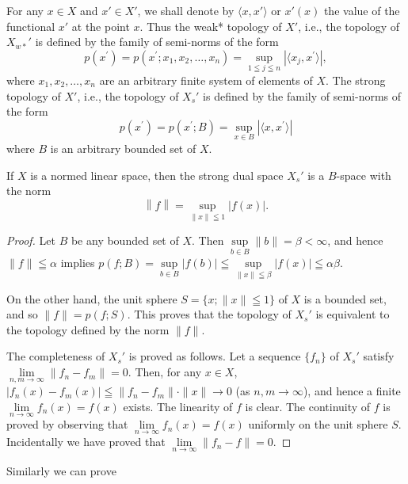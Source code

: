 \begin{definition}\label{def:IV.7.Definition.2} For any $x \in X$ and $x' \in X'$, we shall denote by $\langle x, x' \rangle$ or $x'(x)$ the value of the functional $x'$ at the point $x$. Thus the weak* topology of $X'$, i.e., the topology of $X_{w*}'$ is defined by the family of semi-norms of the form 
\[
p \left(x ^{\prime}\right) = p \left(x ^{\prime}; x _{1}, x _{2}, \dots , x _{n}\right) = \sup\limits _{1 \leqq j \leqq n} | \langle x _{j}, x ^{\prime} \rangle |,
\]
where $x_{1}, x_{2}, \ldots, x_{n}$ are an arbitrary finite system of elements of $X$. The strong topology of $X'$, i.e., the topology of $X_{s}'$ is defined by the family of semi-norms of the form 
\[
p \left(x ^{\prime}\right) = p \left(x ^{\prime}; B\right) = \sup\limits _{x \in B} | \langle x, x ^{\prime} \rangle |
\]
where $B$ is an arbitrary bounded set of $X$. 
\end{definition}

\begin{theorem}\label{thm:IV.7.Theorem.1} If $X$ is a normed linear space, then the strong dual space $X_s'$ is a $B$-space with the norm 
\[
\left\| f \right\| = \sup\limits _{\left\| x \right\| \leqq 1} | f (x) |.
\]
\end{theorem}

\begin{proof}
 Let $B$ be any bounded set of $X$. Then $\sup\limits_{b \in B} \|b\| = \beta < \infty$, and hence $\|f\| \leqq \alpha$ implies $p(f; B) = \sup\limits_{b \in B} |f(b)| \leqq \sup\limits_{\|x\| \leqq \beta} |f(x)| \leqq \alpha \beta$. 

On the other hand, the unit sphere $S = \{x; \|x\| \leqq 1\}$ of $X$ is a bounded set, and so $\|f\| = p(f; S)$. This proves that the topology of $X_s'$ is equivalent to the topology defined by the norm $\|f\|$. 

The completeness of $X_s'$ is proved as follows. Let a sequence $\{f_n\}$ of $X_s'$ satisfy $\lim\limits_{n,m \to \infty} \|f_n - f_m\| = 0$. Then, for any $x \in X$, $|f_n(x) - f_m(x)| \leqq \|f_n - f_m\| \cdot \|x\| \to 0$ (as $n, m \to \infty$), and hence a finite $\lim\limits_{n \to \infty} f_n(x) = f(x)$ exists. The linearity of $f$ is clear. The continuity of $f$ is proved by observing that $\lim\limits_{n \to \infty} f_n(x) = f(x)$ uniformly on the unit sphere $S$. Incidentally we have proved that $\lim\limits_{n \to \infty} \|f_n - f\| = 0$. 
\end{proof}

Similarly we can prove 

